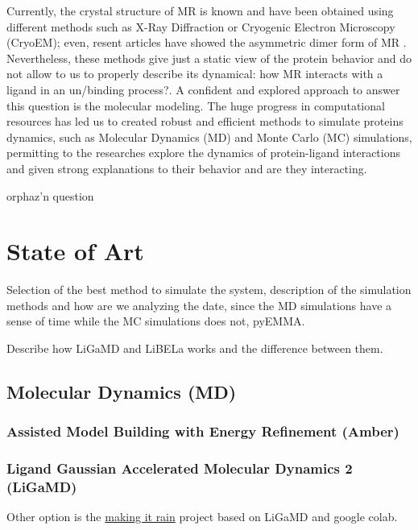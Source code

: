 \documentclass[letter,10pt, twocolumn]{article}
\begin{document}
Currently, the crystal structure of MR is known and have been obtained using different methods such as X-Ray Diffraction or Cryogenic Electron Microscopy (CryoEM); even, resent articles have showed the asymmetric dimer form of MR \cite{dimer}. Nevertheless, these methods give just a static view of the protein behavior and do not allow to us to properly describe its dynamical: how MR interacts with a ligand in an un/binding process?. A confident and explored approach to answer this question is the molecular modeling. The huge progress in computational resources has led us to created robust and efficient methods to simulate proteins dynamics, such as Molecular Dynamics (MD) and Monte Carlo (MC) simulations, permitting to the researches explore the dynamics of protein-ligand interactions and given strong explanations to their behavior and are they interacting.  \cite{md_evidence}



orphaz'n question

\section{State of Art}

Selection of the best method to simulate the system, description of the simulation methods and how are we analyzing the date, since the MD simulations have a sense of time while the MC simulations does not, pyEMMA.

Describe how LiGaMD and LiBELa works and the difference between them.


\subsection{Molecular Dynamics (MD)}

\subsubsection*{\textbf{Assisted Model Building with Energy Refinement (Amber)  
}}


\subsubsection*{\textbf{Ligand Gaussian Accelerated Molecular Dynamics 2 (LiGaMD)}}



\cite{amber, ligamd_Miao, ligamd2}

Other option is the \href{https://github.com/pablo-arantes/making-it-rain}{making it rain} project based on LiGaMD and google colab. \cite{making_it_rain}
\end{document}
